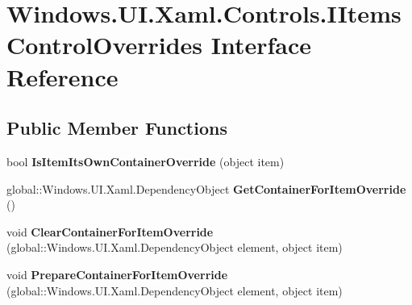 \hypertarget{interface_windows_1_1_u_i_1_1_xaml_1_1_controls_1_1_i_items_control_overrides}{}\section{Windows.\+U\+I.\+Xaml.\+Controls.\+I\+Items\+Control\+Overrides Interface Reference}
\label{interface_windows_1_1_u_i_1_1_xaml_1_1_controls_1_1_i_items_control_overrides}
\subsection*{Public Member Functions}
\begin{DoxyCompactItemize}
\item 
\mbox{\label{interface_windows_1_1_u_i_1_1_xaml_1_1_controls_1_1_i_items_control_overrides_ad9d9073fc349d2a457c581129484ff0f}} 
bool {\bfseries Is\+Item\+Its\+Own\+Container\+Override} (object item)
\item 
\mbox{\label{interface_windows_1_1_u_i_1_1_xaml_1_1_controls_1_1_i_items_control_overrides_a623f7e1da828fb4e0ab4990fc2047874}} 
global\+::\+Windows.\+U\+I.\+Xaml.\+Dependency\+Object {\bfseries Get\+Container\+For\+Item\+Override} ()
\item 
\mbox{\label{interface_windows_1_1_u_i_1_1_xaml_1_1_controls_1_1_i_items_control_overrides_aa7629a88ebc4029aab0c438c06ec0b82}} 
void {\bfseries Clear\+Container\+For\+Item\+Override} (global\+::\+Windows.\+U\+I.\+Xaml.\+Dependency\+Object element, object item)
\item 
\mbox{\label{interface_windows_1_1_u_i_1_1_xaml_1_1_controls_1_1_i_items_control_overrides_a4ebcd3ec353d6e23fb9fc344cc643e0e}} 
void {\bfseries Prepare\+Container\+For\+Item\+Override} (global\+::\+Windows.\+U\+I.\+Xaml.\+Dependency\+Object element, object item)
\item 
\mbox{\label{interface_windows_1_1_u_i_1_1_xaml_1_1_controls_1_1_i_items_control_overrides_aeca7ab8e157178a6cc021cee26bf5388}} 

\end{DoxyCompactItemize}
